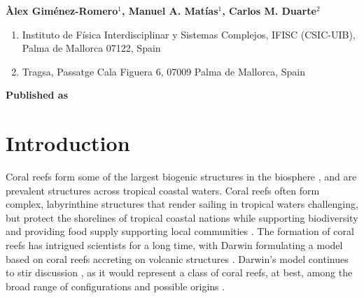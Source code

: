 \vspace{1cm}

\begin{center}
    \textbf{Àlex Giménez-Romero$^{1}$, Manuel A. Matías$^{1}$, Carlos M.
        Duarte$^{2}$}
\end{center}

\vspace{1cm}

\begin{enumerate}
    \small
    \item Instituto de Física Interdisciplinar y Sistemas Complejos, IFISC
          (CSIC-UIB), Palma de Mallorca 07122, Spain
    \item Tragsa, Passatge Cala Figuera 6, 07009 Palma de Mallorca, Spain
\end{enumerate}

\vspace{1cm}

\textbf{Published as}

\vspace{0.5cm}


\newpage
\section{Introduction}

Coral reefs form some of the largest biogenic structures in the biosphere
\cite{wiener2021exploration}, and are prevalent structures across tropical
coastal waters. Coral reefs often form complex, labyrinthine structures that
render sailing in tropical waters challenging, but protect the shorelines of
tropical coastal nations while supporting biodiversity and providing food
supply supporting local communities \cite{Moberg1999}. The formation of coral
reefs has intrigued scientists for a long time, with Darwin formulating a model
based on coral reefs accreting on volcanic structures
\cite{darwin1874structure}. Darwin's model continues to stir discussion
\cite{Droxler2021}, as it would represent a class of coral reefs, at best,
among the broad range of configurations and possible origins
\cite{Scoffin1983}.

